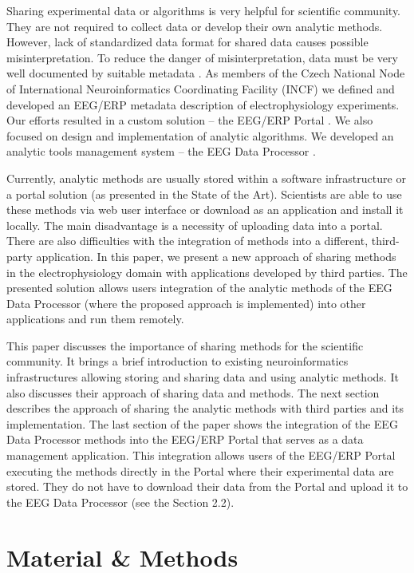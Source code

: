 \documentclass{frontiersSCNS} %
\begin{document}
Sharing experimental data or algorithms is very helpful for scientific community. They are not required to collect data or develop their own analytic methods. However, lack of standardized data format for shared data causes possible misinterpretation. To reduce the danger of misinterpretation, data must be very well documented by suitable metadata \cite{Tetters08}. As members of the Czech National Node of International Neuroinformatics Coordinating Facility (INCF) \cite{INCF} we defined and developed an EEG/ERP metadata description of electrophysiology experiments. Our efforts resulted in a custom solution – the EEG/ERP Portal \cite{Jezek10}. We also focused on design and implementation of analytic algorithms. We developed an analytic tools management system – the EEG Data Processor \cite{Jezek13}.

Currently, analytic methods are usually stored within a software infrastructure or a portal solution (as presented in the State of the Art). Scientists are able to use these methods via web user interface or download as an application and install it locally. The main disadvantage is a necessity of uploading data into a portal. There are also difficulties with the integration of methods into a different, third-party application. In this paper, we present a new approach of sharing methods in the electrophysiology domain with applications developed by third parties. The presented solution allows users integration of the analytic methods of the EEG Data Processor (where the proposed approach is implemented) into other applications and run them remotely.

This paper discusses the importance of sharing methods for the scientific community. It brings a brief introduction to existing neuroinformatics infrastructures allowing storing and sharing data and using analytic methods. It also discusses their approach of sharing data and methods. The next section describes the approach of sharing the analytic methods with third parties and its implementation. The last section of the paper shows the integration of the EEG Data Processor methods into the EEG/ERP Portal that serves as a data management application. This integration allows users of the EEG/ERP Portal executing the methods directly in the Portal where their experimental data are stored. They do not have to download their data from the Portal and upload it to the EEG Data Processor \cite{Jezek13} (see the Section 2.2).

\section{Material \& Methods}
\end{document}

